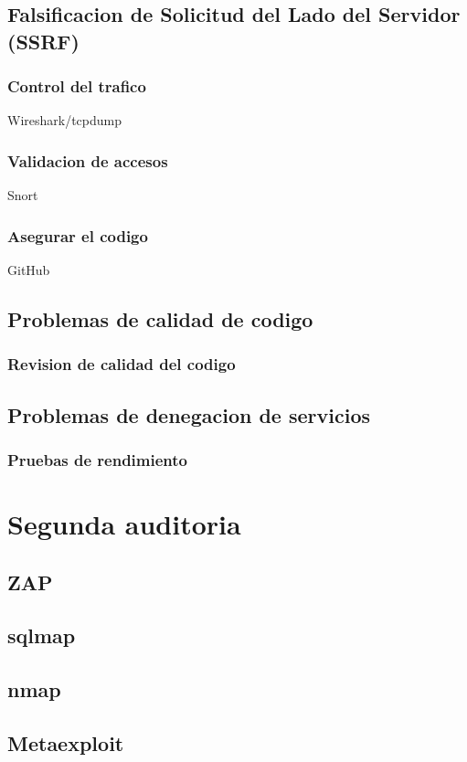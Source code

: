 \documentclass{report}
\begin{document}
        \section{Falsificacion de Solicitud del Lado del Servidor (SSRF)}
            \subsection{Control del trafico}
               Wireshark/tcpdump
            \subsection{Validacion de accesos}
                Snort
            \subsection{Asegurar el codigo}
                GitHub
        \clearpage
        \section{Problemas de calidad de codigo}
            \subsection{Revision de calidad del codigo}
            \clearpage
        \section{Problemas de denegacion de servicios}
            \subsection{Pruebas de rendimiento}
    \chapter{Segunda auditoria}
        \section{ZAP}
        \section{sqlmap}
        \section{nmap}
        \section{Metaexploit}
\end{document}
